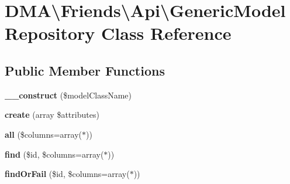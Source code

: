 \hypertarget{classDMA_1_1Friends_1_1Api_1_1GenericModelRepository}{}\section{D\+M\+A\textbackslash{}Friends\textbackslash{}Api\textbackslash{}Generic\+Model\+Repository Class Reference}
\label{classDMA_1_1Friends_1_1Api_1_1GenericModelRepository}
\subsection*{Public Member Functions}
\begin{DoxyCompactItemize}
\item 
\hypertarget{classDMA_1_1Friends_1_1Api_1_1GenericModelRepository_a320f3591265cbdf46a9c9fa26927df10}{}{\bfseries \+\_\+\+\_\+construct} (\$model\+Class\+Name)\label{classDMA_1_1Friends_1_1Api_1_1GenericModelRepository_a320f3591265cbdf46a9c9fa26927df10}

\item 
\hypertarget{classDMA_1_1Friends_1_1Api_1_1GenericModelRepository_ac0e8251f4383610298dddda3eb7958d7}{}{\bfseries create} (array \$attributes)\label{classDMA_1_1Friends_1_1Api_1_1GenericModelRepository_ac0e8251f4383610298dddda3eb7958d7}

\item 
\hypertarget{classDMA_1_1Friends_1_1Api_1_1GenericModelRepository_a4c88d28c6fc169ae1eead0b0aa3866f9}{}{\bfseries all} (\$columns=array(\textquotesingle{}$\ast$\textquotesingle{}))\label{classDMA_1_1Friends_1_1Api_1_1GenericModelRepository_a4c88d28c6fc169ae1eead0b0aa3866f9}

\item 
\hypertarget{classDMA_1_1Friends_1_1Api_1_1GenericModelRepository_ab42b1bda9479d9990e04c9d45f2a0e0d}{}{\bfseries find} (\$id, \$columns=array(\textquotesingle{}$\ast$\textquotesingle{}))\label{classDMA_1_1Friends_1_1Api_1_1GenericModelRepository_ab42b1bda9479d9990e04c9d45f2a0e0d}

\item 
\hypertarget{classDMA_1_1Friends_1_1Api_1_1GenericModelRepository_a0fe974a6605164516635931f06eb4c30}{}{\bfseries find\+Or\+Fail} (\$id, \$columns=array(\textquotesingle{}$\ast$\textquotesingle{}))\label{classDMA_1_1Friends_1_1Api_1_1GenericModelRepository_a0fe974a6605164516635931f06eb4c30}


\end{DoxyCompactItemize}
